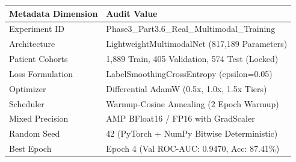 \begin{tabular}{ll}
\toprule
Metadata Dimension & Audit Value \\
\midrule
Experiment ID & Phase3\_Part3.6\_Real\_Multimodal\_Training \\
Architecture & LightweightMultimodalNet (817,189 Parameters) \\
Patient Cohorts & 1,889 Train, 405 Validation, 574 Test (Locked) \\
Loss Formulation & LabelSmoothingCrossEntropy (epsilon=0.05) \\
Optimizer & Differential AdamW (0.5x, 1.0x, 1.5x Tiers) \\
Scheduler & Warmup-Cosine Annealing (2 Epoch Warmup) \\
Mixed Precision & AMP BFloat16 / FP16 with GradScaler \\
Random Seed & 42 (PyTorch + NumPy Bitwise Deterministic) \\
Best Epoch & Epoch 4 (Val ROC-AUC: 0.9470, Acc: 87.41\%) \\
\bottomrule
\end{tabular}
